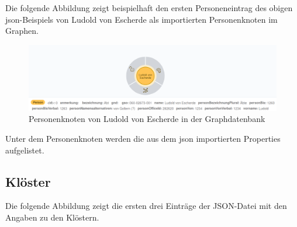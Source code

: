 \documentclass[ngerman,]{scrreprt}
\begin{document}
Die folgende Abbildung zeigt beispielhaft den ersten Personeneintrag des obigen json-Beispiels von Ludold von Escherde als importierten Personenknoten im Graphen.

\begin{figure}
\centering
\includegraphics{Bilder/Germania-Sacra-Personenknoten-mit-Properties.png}
\caption{Personenknoten von Ludold von Escherde in der Graphdatenbank}
\end{figure}

Unter dem Personenknoten werden die aus dem json importierten Properties aufgelistet.

\subsection{Klöster}\label{kluxf6ster}

Die folgende Abbildung zeigt die ersten drei Einträge der JSON-Datei mit den Angaben zu den Klöstern.
\end{document}
